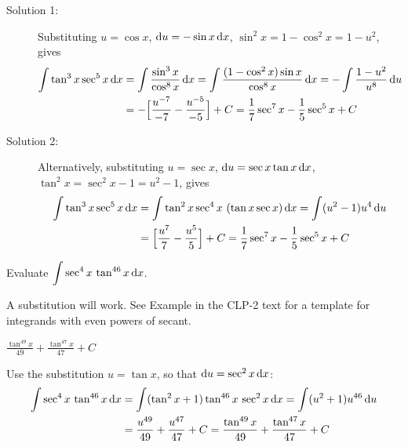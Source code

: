 \begin{solution}
\begin{description}
\item[Solution 1:]
Substituting $u=\cos x$, $\mathrm{d}u=-\sin x\,\mathrm{d}x$, $\sin^2 x= 1-\cos^2x=1-u^2$,
gives
\begin{align*}
\int \tan^3 x \sec^5x \,\mathrm{d}x
&=\int\frac{\sin^3 x}{\cos^8 x}\,\mathrm{d}x
=\int\frac{(1-\cos^2 x)\sin x}{\cos^8 x}\,\mathrm{d}x
=-\int\frac{1-u^2}{u^8}\,\mathrm{d}u \\
&=-\Big[\frac{u^{-7}}{-7}-\frac{u^{-5}}{-5}\Big]+C
=\frac{1}{7}\sec^7 x -\frac{1}{5}\sec^5 x + C
\end{align*}

\item[Solution 2:]
 Alternatively, substituting $u=\sec x$, $\mathrm{d}u=\sec x\tan x\,\mathrm{d}x$,
$\tan^2 x= \sec^2x-1=u^2-1$,
gives
\begin{align*}
\int \tan^3 x \sec^5x \,\mathrm{d}x
&=\int \tan^2 x \sec^4x\ (\tan x\sec x)\,\mathrm{d}x
=\int (u^2-1) u^4\,\mathrm{d}u \\
&=\Big[\frac{u^{7}}{7}-\frac{u^{5}}{5}\Big]+C
=\frac{1}{7}\sec^7 x -\frac{1}{5}\sec^5 x + C
\end{align*}
\end{description}
\end{solution}

\begin{Mquestion}[2016Q3]
Evaluate $\displaystyle\int\sec^4x\,\tan^{46}x\,\mathrm{d}x$.
\end{Mquestion}

\begin{hint}
 A substitution will work.
See Example  in the
CLP-2 text for a template for integrands with even powers of secant.
\end{hint}

\begin{answer}
$\displaystyle\frac{\tan^{49}x}{49}+\frac{\tan^{47}x}{47}+C$
\end{answer}

\begin{solution}
Use the substitution $u=\tan x$, so that $\mathrm{d}u=\sec^2 x\,\mathrm{d}x$:
\begin{align*}
\int\sec^4x\,\tan^{46}x\,\mathrm{d}x
&=\int(\tan^2x+1) \tan^{46}x\, \sec^2 x\,\mathrm{d}x =\int (u^2+1)u^{46}\,\mathrm{d}u \\
&=\frac{u^{49}}{49}+\frac{u^{47}}{47}+C
=\frac{\tan^{49}x}{49}+\frac{\tan^{47}x}{47}+C
\end{align*}
\end{solution}



